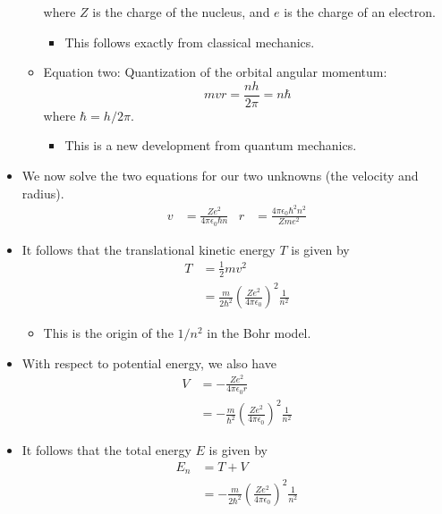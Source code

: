 \documentclass[../notes.tex]{subfiles}
\begin{document}
\begin{itemize}
\begin{itemize}
\begin{equation*}
        \end{equation*}
        where $Z$ is the charge of the nucleus, and $e$ is the charge of an electron.
        \begin{itemize}
            \item This follows exactly from classical mechanics.
        \end{itemize}
        \item Equation two: Quantization of the orbital angular momentum:
        \begin{equation*}
            mvr = \frac{nh}{2\pi} = n\hbar
        \end{equation*}
        where $\hbar=h/2\pi$.
        \begin{itemize}
            \item This is a new development from quantum mechanics.
        \end{itemize}
    \end{itemize}
    \item We now solve the two equations for our two unknowns (the velocity and radius).
    \begin{align*}
        v &= \frac{Ze^2}{4\pi\epsilon_0\hbar n}&
        r &= \frac{4\pi\epsilon_0\hbar^2n^2}{Zme^2}
    \end{align*}
    \item It follows that the translational kinetic energy $T$ is given by
    \begin{align*}
        T &= \frac{1}{2}mv^2\\
        &= \frac{m}{2\hbar^2}\left( \frac{Ze^2}{4\pi\epsilon_0} \right)^2\frac{1}{n^2}
    \end{align*}
    \begin{itemize}
        \item This is the origin of the $1/n^2$ in the Bohr model.
    \end{itemize}
    \item With respect to potential energy, we also have
    \begin{align*}
        V &= -\frac{Ze^2}{4\pi\epsilon_0r}\\
        &= -\frac{m}{\hbar^2}\left( \frac{Ze^2}{4\pi\epsilon_0} \right)^2\frac{1}{n^2}
    \end{align*}
    \item It follows that the total energy $E$ is given by
    \begin{align*}
        E_n &= T+V\\
        &= -\frac{m}{2\hbar^2}\left( \frac{Ze^2}{4\pi\epsilon_0} \right)^2\frac{1}{n^2}

\end{align*}
\end{itemize}
\end{document}
